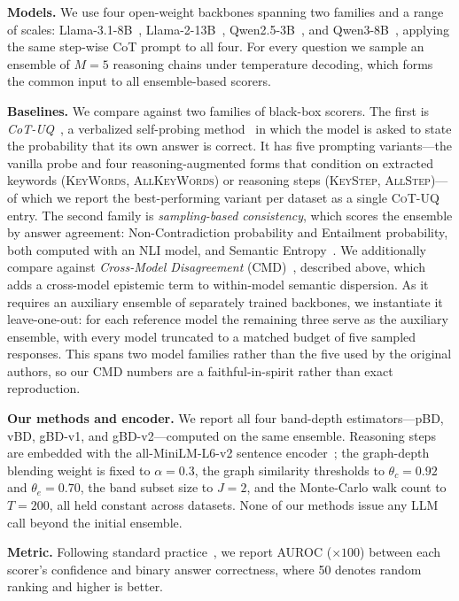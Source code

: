 \documentclass[letterpaper]{article} %
\begin{document}
\textbf{Models.} We use four open-weight backbones spanning two families and a
range of scales: Llama-3.1-8B~\citep{grattafiori2024llama3},
Llama-2-13B~\citep{touvron2023llama2},
Qwen2.5-3B~\citep{qwen2024qwen25}, and Qwen3-8B~\citep{qwen2025qwen3}, applying
the same step-wise CoT prompt to all
four. For every question we sample an ensemble of $M = 5$ reasoning chains under
temperature decoding, which forms the common input to all ensemble-based scorers.

\textbf{Baselines.} We compare against two families of black-box scorers. The
first is \emph{CoT-UQ}~\citep{zhang2025cotuq}, a verbalized self-probing
method~\citep{xiong2024llms} in which the model is asked to state the probability
that its own answer is correct. It has five prompting variants---the vanilla
probe and four reasoning-augmented forms that condition on extracted keywords
(\textsc{KeyWords}, \textsc{AllKeyWords}) or reasoning steps (\textsc{KeyStep},
\textsc{AllStep})---of which we report the best-performing variant per dataset as
a single \textsc{CoT-UQ} entry. The second family is
\emph{sampling-based consistency}, which scores the ensemble by answer agreement:
Non-Contradiction probability and Entailment probability, both computed with an
NLI model, and Semantic Entropy~\citep{kuhn2023semantic, farquhar2024detecting}.
We additionally compare against \emph{Cross-Model Disagreement}
(CMD)~\citep{hamidieh2026crossmodel}, described above, which adds a cross-model
epistemic term to within-model semantic dispersion. As it requires an auxiliary
ensemble of separately trained backbones, we instantiate it leave-one-out: for each
reference model the remaining three serve as the auxiliary ensemble, with every
model truncated to a matched budget of five sampled responses. This spans two model
families rather than the five used by the original authors, so our CMD numbers are
a faithful-in-spirit rather than exact reproduction.

\textbf{Our methods and encoder.} We report all four band-depth estimators---pBD,
vBD, gBD-v1, and gBD-v2---computed on the same ensemble. Reasoning steps are
embedded with the all-MiniLM-L6-v2 sentence encoder~\citep{reimers2019sentencebert};
the graph-depth blending weight is fixed to $\alpha = 0.3$, the graph similarity
thresholds to $\theta_c = 0.92$ and $\theta_e = 0.70$, the band subset size to
$J = 2$, and the Monte-Carlo walk count to $T = 200$, all held constant across
datasets. None of our methods issue any LLM call beyond the initial ensemble.

\textbf{Metric.} Following standard practice~\citep{kuhn2023semantic, xiong2024llms},
we report AUROC ($\times 100$) between each scorer's confidence and binary answer
correctness, where 50 denotes random ranking and higher is better.
\end{document}
